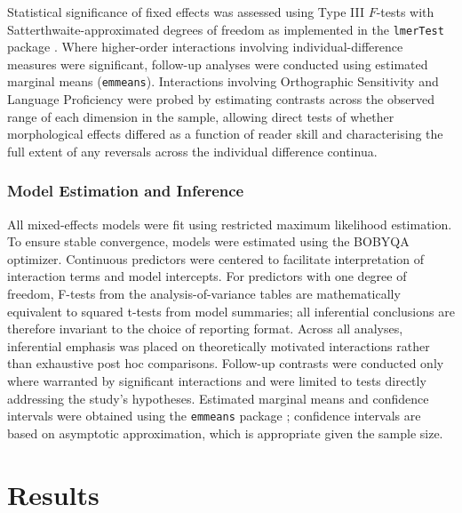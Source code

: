\documentclass[utf8]{FrontiersinHarvard} %
\begin{document}
	Statistical significance of fixed effects was assessed using Type III $F$-tests with Satterthwaite-approximated degrees of freedom as implemented in the \texttt{lmerTest} package \citep{kuznetsovaLmerTestPackageTests2017}. Where higher-order interactions involving individual-difference measures were significant, follow-up analyses were conducted using estimated marginal means (\texttt{emmeans}). Interactions involving Orthographic Sensitivity and Language Proficiency were probed by estimating contrasts across the observed range of each dimension in the sample, allowing direct tests of whether morphological effects differed as a function of reader skill and characterising the full extent of any reversals across the individual difference continua.
	
	\subsubsection{Model Estimation and Inference}
	All mixed-effects models were fit using restricted maximum likelihood estimation. To ensure stable convergence, models were estimated using the BOBYQA optimizer. Continuous predictors were centered to facilitate interpretation of interaction terms and model intercepts. For predictors with one degree of freedom, F-tests from the analysis-of-variance tables are mathematically equivalent to squared t-tests from model summaries; all inferential conclusions are therefore invariant to the choice of reporting format. Across all analyses, inferential emphasis was placed on theoretically motivated interactions rather than exhaustive post hoc comparisons. Follow-up contrasts were conducted only where warranted by significant interactions and were limited to tests directly addressing the study’s hypotheses. Estimated marginal means and confidence intervals were obtained using the \texttt{emmeans} package \citep{lenthEmmeansEstimatedMarginal2026}; confidence intervals are based on asymptotic approximation, which is appropriate given the sample size.
	
	\section{Results}
	
\end{document}
